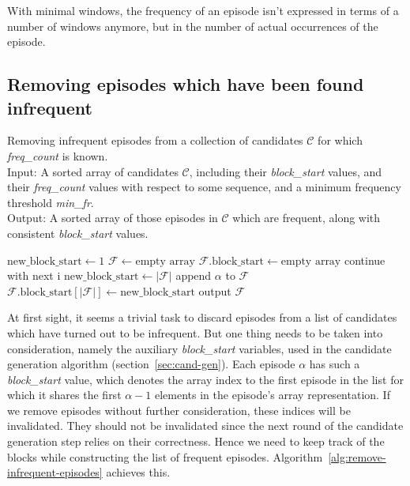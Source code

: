 With minimal windows, the frequency of an episode isn't expressed in terms of a number of windows anymore, but in the number of actual occurrences of the episode.

\subsection{Removing episodes which have been found infrequent}

\begin{algorithm}

\caption{Removing infrequent episodes from a collection of candidates $ \mathcal{C} $ for which \emph{freq\_count} is known. \\
Input: A sorted array of candidates $ \mathcal{C} $, including their \emph{block\_start} values, and their \emph{freq\_count} values with respect to some sequence, and a minimum frequency threshold \emph{min\_fr}. \\
Output: A sorted array of those episodes in $ \mathcal{C} $ which are frequent, along with consistent \emph{block\_start} values.
}

\begin{algorithmic}[1]

\State $ \text{new\_block\_start} \gets 1 $
\State $ \mathcal{F} \gets \text{empty array} $
\State $ \mathcal{F} \text{.block\_start} \gets \text{empty array} $
        \State continue with next i
    \EndIf
     \label{alglin:remove-infrequent-episodes:different-block-test}
        \State $ \text{new\_block\_start} \gets | \mathcal{F} | $
    \EndIf
    \State append $ \alpha $ to $ \mathcal{F} $
    \State $ \mathcal{F} \text{.block\_start}[ | \mathcal{F} | ] \gets \text{new\_block\_start} $
\EndFor
\State output $ \mathcal{F} $

\end{algorithmic}

\label{alg:remove-infrequent-episodes}
\end{algorithm}

At first sight, it seems a trivial task to discard episodes from a list of candidates which have turned out to be infrequent. But one thing needs to be taken into consideration, namely the auxiliary \emph{block\_start} variables, used in the candidate generation algorithm (section~\ref{sec:cand-gen}). Each episode $ \alpha $ has such a \emph{block\_start} value, which denotes the array index to the first episode in the list for which it shares the first $ \alpha - 1 $ elements in the episode's array representation. If we remove episodes without further consideration, these indices will be invalidated. They should not be invalidated since the next round of the candidate generation step relies on their correctness. Hence we need to keep track of the blocks while constructing the list of frequent episodes. Algorithm~\ref{alg:remove-infrequent-episodes} achieves this.

